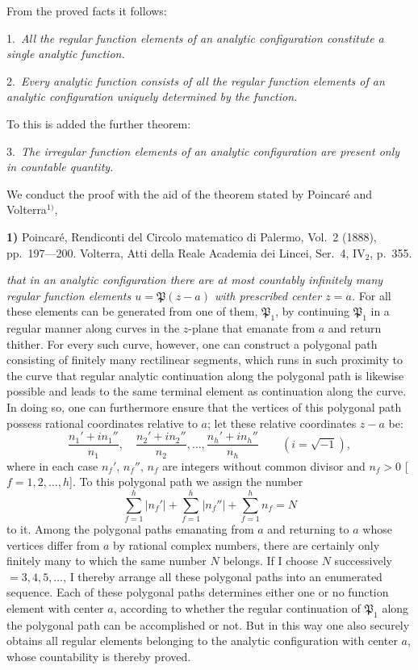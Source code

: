 \documentclass{article}
\begin{document}
From the proved facts it follows:

1.\ \emph{All the regular function elements of an analytic configuration constitute a single analytic function.}

2.\ \emph{Every analytic function consists of all the regular function elements of an analytic configuration uniquely determined by the function.}

To this is added the further theorem:

3.\ \emph{The irregular function elements of an analytic configuration are present only in countable quantity.}

We conduct the proof with the aid of the theorem stated by Poincaré and Volterra${}^{1)}$,

\textbf{1)} Poincaré, Rendiconti del Circolo matematico di Palermo, Vol.~2 (1888), pp.~197---200. Volterra, Atti della Reale Academia dei Lincei, Ser.~4, $\mathrm{IV}_2$, p.~355.

\emph{that in an analytic configuration there are at most countably infinitely many regular function elements $u = \mathfrak{P}(z - a)$ with prescribed center $z = a$.} For all these elements can be generated from one of them, $\mathfrak{P}_1$, by continuing $\mathfrak{P}_1$ in a regular manner along curves in the $z$-plane that emanate from $a$ and return thither. For every such curve, however, one can construct a polygonal path consisting of finitely many rectilinear segments, which runs in such proximity to the curve that regular analytic continuation along the polygonal path is likewise possible and leads to the same terminal element as continuation along the curve. In doing so, one can furthermore ensure that the vertices of this polygonal path possess rational coordinates relative to $a$; let these relative coordinates $z - a$ be:
\[ \frac{n_1' + i n_1''}{n_1}, \quad \frac{n_2' + i n_2''}{n_2}, \dots, \frac{n_h' + i n_h''}{n_h} \qquad (i = \sqrt{-1}), \]
where in each case $n_f'$, $n_f''$, $n_f$ are integers without common divisor and $n_f > 0$ [$f = 1, 2, \dots, h$]. To this polygonal path we assign the number
\[ \sum_{f=1}^h |n_f'| + \sum_{f=1}^h |n_f''| + \sum_{f=1}^h n_f = N \]
to it.
Among the polygonal paths emanating from $a$ and returning to $a$ whose vertices differ from $a$ by rational complex numbers, there are certainly only finitely many to which the same number $N$ belongs. If I choose $N$ successively $= 3, 4, 5, \dots$, I thereby arrange all these polygonal paths into an enumerated sequence. Each of these polygonal paths determines either one or no function element with center $a$, according to whether the regular continuation of $\mathfrak{P}_1$ along the polygonal path can be accomplished or not. But in this way one also securely obtains all regular elements belonging to the analytic configuration with center $a$, whose countability is thereby proved.
\end{document}
